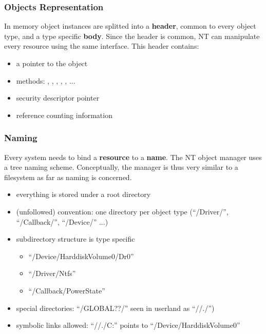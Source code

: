 \begin{frame}
  \frametitle{Objects Representation}

  In memory object instances are splitted into a \textbf{header}, common to every
  object type, and a type specific \textbf{body}. Since the header is common,
  NT can manipulate every resource using the same interface. This header contains:

  \begin{itemize}
    \item
      a pointer to the object 
    \item
      methods: , , , , ,  ...
    \item
      security descriptor pointer
    \item
      reference counting information 
  \end{itemize}
\end{frame}


\begin{frame}
  \frametitle{Naming}

  Every system needs to bind a \textbf{resource} to a \textbf{name}. The NT object
  manager uses a tree naming scheme. Conceptually, the manager is thus very similar
  to a filesystem as far as naming is concerned.

  \begin{itemize}
    \item
      everything is stored  under a root directory
    \item
      (unfollowed) convention: one directory per object type (``/Driver/'', ``/Callback/'', ``/Device/'' ...)
    \item
      subdirectory structure is type specific

      \begin{itemize}
        \item
          ``/Device/HarddiskVolume0/Dr0''
        \item
          ``/Driver/Ntfs''
        \item
          ``/Callback/PowerState''
      \end{itemize}

    \item
      special directories: ``/GLOBAL??/'' seen in userland as ``//./'')
    \item
      symbolic links allowed: ``//./C:'' points to ``/Device/HarddiskVolume0''
  \end{itemize}

\end{frame}


